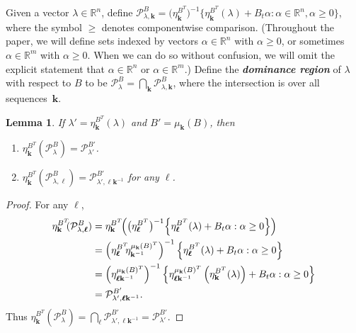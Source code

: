 \documentclass{amsart}
\newtheorem{lemma}[proposition]{Lemma}
\theoremstyle{definition}
\theoremstyle{remark}
\numberwithin{equation}{section}
\newcommand{\newword}[1]{\textbf{\emph{#1}}}
\newcommand{\reals}{\mathbb R}
\newcommand{\set}[1]{{\lbrace #1 \rbrace}}
\newcommand{\sett}[1]{{\bigl\lbrace #1 \bigr\rbrace}}
\newcommand{\settt}[1]{{\Bigl\lbrace #1 \Bigr\rbrace}}
\newcommand{\0}{{\mathbf{0}}}
\newcommand{\kk}{\mathbf{k}}
\renewcommand{\ll}{{\boldsymbol\ell}}
\renewcommand{\P}{\mathcal{P}}
\begin{document}
Given a vector $\lambda\in\reals^n$, define $\P^B_{\lambda,\kk}=\bigl(\eta_{\kk}^{B^T}\bigr)^{-1}\sett{\eta_\kk^{B^T}(\lambda)+B_t\alpha:\alpha\in\reals^n,\alpha\ge0}$, where the symbol $\ge$ denotes componentwise comparison.
(Throughout the paper, we will define sets indexed by vectors $\alpha\in\reals^n$ with $\alpha\ge0$, or sometimes $\alpha\in\reals^m$ with $\alpha\ge0$.
When we can do so without confusion, we will omit the explicit statement that $\alpha\in\reals^n$ or $\alpha\in\reals^m$.)
Define the \newword{dominance region} of $\lambda$ with respect to $B$ to be $\P^B_\lambda=\bigcap_\kk\P^B_{\lambda,\kk}$, where the intersection is over all sequences~$\kk$.
\begin{lemma}\label{shift}
If $\lambda'=\eta^{B^T}_\kk(\lambda)$ and $B'=\mu_\kk(B)$, then 
\begin{enumerate}[\quad\bf1.]
\item \label{shift all}
$\eta^{B^T}_\kk\!\!(\P^B_\lambda)=\P^{B'}_{\lambda'}$.
\item \label{shift one}
$\eta^{B^T}_\kk\!\!(\P^B_{\lambda,\ll})=\P^{B'}_{\lambda',\ll\kk^{-1}}$ for any $\ll$.
\end{enumerate}
\end{lemma}
\begin{proof}
For any $\ll$,
\begin{align*}
\eta^{B^T}_\kk\!\!(\P^B_{\lambda,\ll})
&=\eta^{B^T}_\kk\!\!\left(\bigl(\eta_{\ll}^{B^T}\bigr)^{-1}\settt{\eta_\ll^{B^T}(\lambda)+B_t\alpha:\alpha\ge0}\right)\\
&=\left(\eta^{B^T}_\ll\!\!\eta_{\kk^{-1}}^{\mu_\kk(B)^T}\right)^{-1}\settt{\eta_\ll^{B^T}(\lambda)+B_t\alpha:\alpha\ge0}\\
&=\left(\eta^{\mu_\kk(B)^T}_{\ll\kk^{-1}}\right)^{-1}\settt{\eta^{\mu_\kk(B)^T}_{\ll\kk^{-1}}\left(\eta^{B^T}_\kk(\lambda)\right)+B_t\alpha:\alpha\ge0}\\
&=\P^{B'}_{\lambda',\ll\kk^{-1}}.
\end{align*}
Thus $\eta^{B^T}_\kk\!\!(\P^B_\lambda)=\bigcap_\ll\P^{B'}_{\lambda',\ll\kk^{-1}}=\P^{B'}_{\lambda'}$.
\end{proof}
\end{document}
